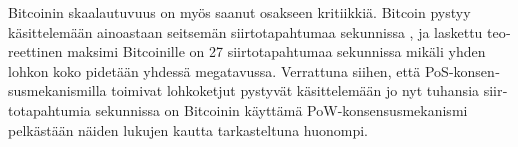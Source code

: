 \begin{otherlanguage}{english}
Bitcoinin skaalautuvuus on myös saanut osakseen kritiikkiä. Bitcoin pystyy käsittelemään ainoastaan seitsemän siirtotapahtumaa sekunnissa \cite{bitcoin-tps}, ja laskettu teoreettinen maksimi Bitcoinille on 27 siirtotapahtumaa sekunnissa mikäli yhden lohkon koko pidetään yhdessä megatavussa. Verrattuna siihen, että PoS-konsensusmekanismilla toimivat lohkoketjut pystyvät käsittelemään jo nyt tuhansia siirtotapahtumia sekunnissa \cite{algorandtech, cardano-ouroboros} on Bitcoinin käyttämä PoW-konsensusmekanismi pelkästään näiden lukujen kautta tarkasteltuna huonompi.

\end{otherlanguage}